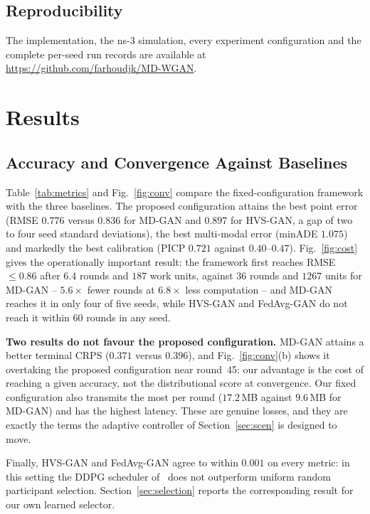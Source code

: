 \documentclass[journal]{IEEEtran}
\begin{document}
\subsection{Reproducibility}
The implementation, the ns-3 simulation, every experiment configuration and the
complete per-seed run records are available at
\url{https://github.com/farhoudjk/MD-WGAN}.

\section{Results}
\label{sec:results}

\subsection{Accuracy and Convergence Against Baselines}
\label{sec:sota}
Table~\ref{tab:metrics} and Fig.~\ref{fig:conv} compare the fixed-configuration
framework with the three baselines. The proposed configuration attains the best
point error (RMSE $0.776$ versus $0.836$ for MD-GAN and $0.897$ for HVS-GAN, a
gap of two to four seed standard deviations), the best multi-modal error
(minADE $1.075$) and markedly the best calibration (PICP $0.721$ against
$0.40$--$0.47$). Fig.~\ref{fig:cost} gives the operationally important result:
the framework first reaches RMSE $\le0.86$ after $6.4$ rounds and $187$ work
units, against $36$ rounds and $1267$ units for MD-GAN -- $5.6\times$ fewer
rounds at $6.8\times$ less computation -- and MD-GAN reaches it in only four of
five seeds, while HVS-GAN and FedAvg-GAN do not reach it within 60 rounds in
any seed.

\textbf{Two results do not favour the proposed configuration.} MD-GAN attains
a better terminal CRPS ($0.371$ versus $0.396$), and Fig.~\ref{fig:conv}(b)
shows it overtaking the proposed configuration near round~45: our advantage is
the cost of reaching a given accuracy, not the distributional score at
convergence. Our fixed configuration also transmits the most per round
($17.2$\,MB against $9.6$\,MB for MD-GAN) and has the highest latency. These are
genuine losses, and they are exactly the terms the adaptive controller of
Section~\ref{sec:scen} is designed to move.

Finally, HVS-GAN and FedAvg-GAN agree to within $0.001$ on every metric: in
this setting the DDPG scheduler of~\cite{wu2024hvsgan} does not outperform
uniform random participant selection. Section~\ref{sec:selection} reports the
corresponding result for our own learned selector.
\end{document}
